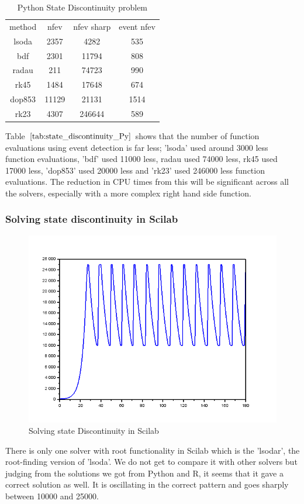 \begin{table}[h]
\caption {Python State Discontinuity problem} \label{tab:state_discontinuity_Py}
\begin{center}
\begin{tabular}{ c c c c } 
    method & nfev & nfev sharp & event nfev  \\ 
    lsoda  &   2357    &4282   & 535  \\
    bdf    &   2301   &11794  & 808  \\
    radau  &   211   &74723  & 990  \\
    rk45   &   1484   &17648  & 674  \\
    dop853 &   11129   &21131  & 1514 \\
    rk23   &   4307   &246644 & 589  \\
\end{tabular}
\end{center}
\end{table}

Table $\ref{tab:state_discontinuity_Py}$ shows that the number of function evaluations using event detection is far less; 'lsoda' used around 3000 less function evaluations, 'bdf' used 11000 less, radau used 74000 less, rk45 used 17000 less, 'dop853' used 20000 less and 'rk23' used 246000 less function evaluations. The reduction in CPU times from this will be significant across all the solvers, especially with a more complex right hand side function.

\subsubsection{Solving state discontinuity in Scilab}
\begin{figure}[h]
	\centering
	\includegraphics[width=0.7\linewidth]{./figures/solve_state_discontinuity_scilab}
	\caption{Solving state Discontinuity in Scilab}
	\label{fig:solve_state_discontinuity_scilab}
\end{figure}
There is only one solver with root functionality in Scilab which is the 'lsodar', the root-finding version of 'lsoda'. We do not get to compare it with other solvers but judging from the solutions we got from Python and R, it seems that it gave a correct solution as well. It is oscillating in the correct pattern and goes sharply between 10000 and 25000.


